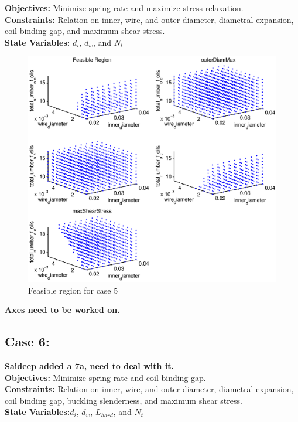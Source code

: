 \documentclass[10pt]{article}
\begin{document}
	\textbf{Objectives:} Minimize spring rate and maximize stress relaxation.\\
	\textbf{Constraints:}  Relation on inner, wire, and outer diameter, diametral expansion, coil binding gap, and maximum shear stress. \\
		\textbf{State Variables:} $d_{i}$, $d_{w}$, and $N_{t}$ \\
		
				\begin{figure}[h!]
		 \begin{center}\includegraphics[scale=.50]{Case_511_34810.eps}\end{center}
		 \caption{Feasible region for case 5}
		 \label{Feasible Case 5}
		 
		 \end{figure}
		 \textbf{Axes need to be worked on.}

\newpage
\subsection{Case 6:}
\label{sec:Case6}
\textbf{Saideep added a 7a, need to deal with it.}\\
	\textbf{Objectives:} Minimize spring rate and coil binding gap.\\
	\textbf{Constraints:} Relation on inner, wire, and outer diameter, diametral expansion, coil binding gap, buckling slenderness, and maximum shear stress. \\
		\textbf{State Variables:}$d_{i}$, $d_{w}$, $L_{hard}$, and $N_{t}$ \\
\end{document}
